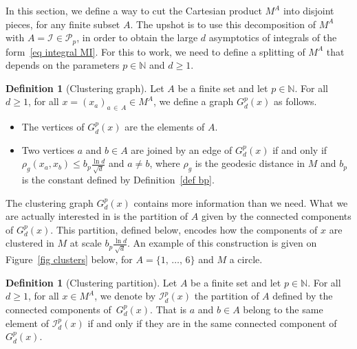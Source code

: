 \documentclass[10pt]{amsart}
\theoremstyle{definition}\newtheorem{defi}[theo]{Definition}\newtheorem{rema}[theo]{Remark}\newtheorem{exam}[theo]{Example}\newtheorem{exem}[theo]{Example}\newtheorem{nota}[theo]{Notation}
\newcommand{\I}{\mathcal{I}}
\newcommand{\pa}{\mathcal{P}\!}
\newcommand{\N}{\mathbb{N}}
\renewcommand{\geq}{\geqslant}
\renewcommand{\leq}{\leqslant}
\begin{document}
In this section, we define a way to cut the Cartesian product $M^A$ into disjoint pieces, for any finite subset $A$. The upshot is to use this decomposition of $M^A$ with $A = \I \in \pa_p$, in order to obtain the large $d$ asymptotics of integrals of the form~\eqref{eq integral MI}. For this to work, we need to define a splitting of $M^A$ that depends on the parameters $p \in \N$ and $d \geq 1$.

\begin{defi}[{Clustering graph}]\label{def Gdp}
Let $A$ be a finite set and let $p \in \N$. For all $d \geq 1$, for all $x =(x_a)_{a\,\in\,A} \in M^A$, we define a graph $G^p_d(x)$ as follows.
\begin{itemize}
\item The vertices of $G^p_d(x)$ are the elements of $A$.
\item Two vertices $a$ and $b \in A$ are joined by an edge of $G^p_d(x)$ if and only if $\rho_g(x_a,x_b) \leq b_p \frac{\ln d}{\sqrt{d}}$ and $a \neq b$, where $\rho_g$ is the geodesic distance in $M$ and $b_p$ is the constant defined by Definition~\ref{def bp}.
\end{itemize}
\end{defi}

The clustering graph $G^p_d(x)$ contains more information than we need. What we are actually interested in is the partition of $A$ given by the connected components of $G^p_d(x)$. This partition, defined below, encodes how the components of $x$ are clustered in $M$ at scale $b_p\tfrac{\ln d}{\sqrt{d}}$. An example of this construction is given on Figure~\ref{fig clusters} below, for $A = \{1,\,\dots,\,6\}$ and $M$ a circle.

\begin{defi}[{Clustering partition}]\label{def Idp}
Let $A$ be a finite set and let $p \in \N$. For all $d \geq 1$, for all $x \in M^A$, we denote by $\I_d^p(x)$ the partition of $A$ defined by the connected components of~$G_d^p(x)$. That is $a$ and $b \in A$ belong to the same element of $\I_d^p(x)$ if and only if they are in the same connected component of $G_d^p(x)$.
\end{defi}

\usetikzlibrary{graphs}
\usetikzlibrary{arrows}
\end{document}
